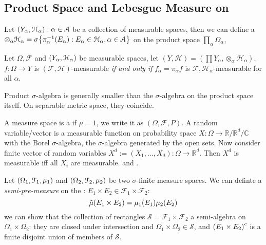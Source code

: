 \subsection{Product Space and Lebesgue Measure on }


Let \(\pqty{Y_{\alpha}, \mathcal{H}_{\alpha}}: \alpha\in \mathcal{A} \) be a collection of measurable spaces, then we can define a  \(\otimes_{\alpha} \mathcal{H}_{\alpha} = \sigma\Bqty{\pi_{\alpha}^{-1} (E_{\alpha}): E_{\alpha} \in \mathcal{H}_{\alpha}, \alpha \in \mathcal{A}}\) on the product space \(\prod_{\alpha} \Omega_{\alpha}\),  
\begin{proposition}
    Let \(\Omega, \mathcal{F}\) and \(\pqty{Y_{\alpha}, \mathcal{H}_{\alpha}}\) be measurable spaces, let \((Y, \mathcal{H}) = (\prod Y_{\alpha}, \otimes_{\alpha} \mathcal{H}_{\alpha})\). \(f : \Omega \to Y\) is \((\mathcal{F}, \mathcal{H})\)-measurable \textit{if and only if} \(f_{\alpha} = \pi_{\alpha} f\) is \(\mathcal{F} ,\mathcal{H}_{\alpha}\)-measurable for all \(\alpha\).
\end{proposition} 

\begin{proposition}
    Product \(\sigma\)-algebra is generally smaller than the \(\sigma\)-algebra on the product space itself. On separable metric space, they coincide. 
\end{proposition}

A measure space is a  if \(\mu =1\), we write it as \((\Omega, \mathcal{F}, P)\). A random variable/vector is a measurable function on probability space \(X: \Omega \to \mathbb{R}/\mathbb{R}^{d}/\mathbb{C}\) with the Borel \(\sigma\)-algebra, the \(\sigma\)-algebra generated by the open sets.
{}
Now consider finite vector of random variables \(X^{d} := (X_{1}, \dots,X_{d}) : \Omega \to \mathbb{R}^{d}\). Then \(X^{d}\) is measurable iff all \(X_{i}\) are measurable. 
 and . 


Let \(\pqty{\Omega_{1}, \mathcal{F}_{1}, \mu_{1}}\) and \(\pqty{\Omega_{2}, \mathcal{F}_{2} , \mu_{2}}\) be two \(\sigma\)-finite measure spaces. We can definte a \textit{semi-pre-measure} on the : \(E_{1}\times E_{2} \in \mathcal{F}_{1} \times \mathcal{F}_{2}\):
\begin{equation*}
    \tilde{\mu} \pqty{E_{1} \times E_{2}} = \mu_{1} \pqty{E_{1}} \mu_{2} \pqty{E_{2}}
\end{equation*}
we can show that the collection of rectangles \(\mathcal{S} = \mathcal{F}_{1}\times \mathcal{F}_{2}\) a semi-algebra  on \(\Omega_{1}\times \Omega_{2}\): they are closed under intersection and \(\Omega_{1} \times \Omega_{2} \in \mathcal{S}\), and \(\pqty{E_{1}\times E_{2}}^{c}\) is a finite disjoint union of members of \(\mathcal{S}\). 

